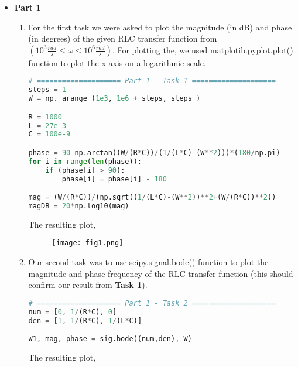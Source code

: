 \documentclass[12pt,a4paper]{article}
\begin{document}
\begin{itemize}

\item \textbf{Part 1}\\
\begin{enumerate}

    \item
    For the first task we were asked to plot the magnitude (in dB) and phase (in degrees) of the given RLC transfer function from $(10^3 \frac{rad}{s} \leq \omega \leq 10^6 \frac{rad}{s})$. For plotting the, we used matplotib.pyplot.plot() function to plot the x-axis on a logarithmic scale.\\

\begin{lstlisting}[language=Python, caption={Part 1, Task1}, label={lst:code}, mathescape=true, breaklines=true]
# ==================== Part 1 - Task 1 ====================
steps = 1
W = np. arange (1e3, 1e6 + steps, steps ) 

R = 1000
L = 27e-3
C = 100e-9

phase = 90-np.arctan((W/(R*C))/(1/(L*C)-(W**2)))*(180/np.pi)
for i in range(len(phase)):
    if (phase[i] > 90):
        phase[i] = phase[i] - 180

mag = (W/(R*C))/(np.sqrt((1/(L*C)-(W**2))**2+(W/(R*C))**2))
magDB = 20*np.log10(mag)
\end{lstlisting}

The resulting plot,

\begin{figure}[h]
    \centering
    \texttt{[image: fig1.png]}
\end{figure}\textbf{}
\clearpage

    \item
    Our second task was to use scipy.signal.bode() function to plot the magnitude and phase frequency of the RLC transfer function (this should confirm our result from \textbf{Task 1}).\\

\begin{lstlisting}[language=Python, caption={Task 2, Part 1}, label={lst:code}, mathescape=true, breaklines=true]
# ==================== Part 1 - Task 2 ====================
num = [0, 1/(R*C), 0]
den = [1, 1/(R*C), 1/(L*C)]

W1, mag, phase = sig.bode((num,den), W)
\end{lstlisting}

The resulting plot,


\end{enumerate}
\end{itemize}
\end{document}
